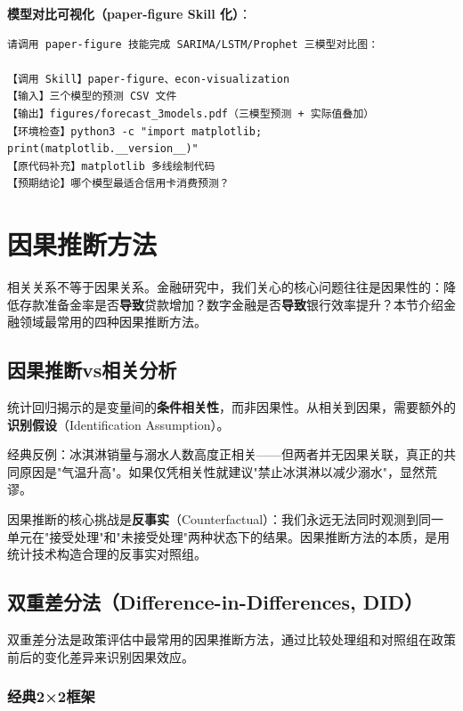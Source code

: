 \textbf{模型对比可视化（paper-figure Skill 化）}：
\begin{lstlisting}
请调用 paper-figure 技能完成 SARIMA/LSTM/Prophet 三模型对比图：

【调用 Skill】paper-figure、econ-visualization
【输入】三个模型的预测 CSV 文件
【输出】figures/forecast_3models.pdf（三模型预测 + 实际值叠加）
【环境检查】python3 -c "import matplotlib; print(matplotlib.__version__)"
【原代码补充】matplotlib 多线绘制代码
【预期结论】哪个模型最适合信用卡消费预测？
\end{lstlisting}

\section{因果推断方法}

相关关系不等于因果关系。金融研究中，我们关心的核心问题往往是因果性的：降低存款准备金率是否\textbf{导致}贷款增加？数字金融是否\textbf{导致}银行效率提升？本节介绍金融领域最常用的四种因果推断方法。

\subsection{因果推断vs相关分析}

\begin{theorybox}[相关$\neq$因果]
统计回归揭示的是变量间的\textbf{条件相关性}，而非因果性。从相关到因果，需要额外的\textbf{识别假设}（Identification Assumption）。

经典反例：冰淇淋销量与溺水人数高度正相关——但两者并无因果关联，真正的共同原因是"气温升高"。如果仅凭相关性就建议"禁止冰淇淋以减少溺水"，显然荒谬。

因果推断的核心挑战是\textbf{反事实}（Counterfactual）：我们永远无法同时观测到同一单元在"接受处理"和"未接受处理"两种状态下的结果。因果推断方法的本质，是用统计技术构造合理的反事实对照组。
\end{theorybox}

\subsection{双重差分法（Difference-in-Differences, DID）}

双重差分法是政策评估中最常用的因果推断方法，通过比较处理组和对照组在政策前后的变化差异来识别因果效应。

\subsubsection{经典2×2框架}

